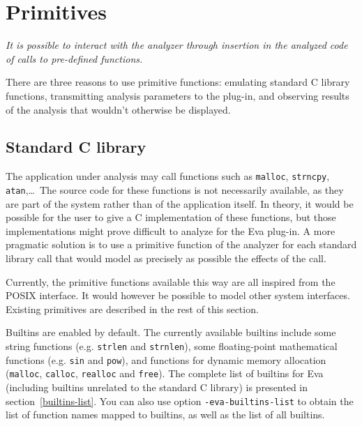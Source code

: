 \documentclass[web]{frama-c-book}
\newcommand{\Eva}{\textsf{Eva}}
\begin{document}
\chapter{Primitives}\label{primitives}
\vspace{2cm}

{\em It is possible to interact with the analyzer
through insertion in the analyzed code of calls to
pre-defined functions.}

\vspace{2cm}

There are three reasons to use primitive functions:
emulating standard C library functions, transmitting
analysis parameters to the plug-in,
and observing results of the analysis that wouldn't otherwise
be displayed.

\section{Standard C library}
\label{libc}

The application under analysis may call functions such as
\lstinline|malloc|, \lstinline|strncpy|, \lstinline|atan|,\ldots\
The source code for these functions is not necessarily available, as
they are part of the system rather than of the application itself. In
theory, it would be possible for the user to give a C implementation
of these functions, but those implementations might prove difficult to
analyze for the \Eva{} plug-in. A more pragmatic solution is to use a
primitive function of the analyzer for each standard library call that
would model as precisely as possible the effects of the call.

Currently, the primitive functions available this way are all inspired
from the \mbox{POSIX} interface. It would however be possible to model
other system interfaces. Existing primitives are described in the rest
of this section.

Builtins are enabled by default. The currently available builtins include
some string functions (e.g. \lstinline|strlen| and \lstinline|strnlen|),
some floating-point mathematical functions (e.g. \lstinline|sin| and
\lstinline|pow|), and functions for dynamic memory allocation
(\lstinline|malloc|, \lstinline|calloc|, \lstinline|realloc| and
\lstinline|free|).
%
The complete list of builtins for \Eva{} (including builtins
unrelated to the standard C library) is presented in
section~\ref{builtins-list}.
%
You can also use option \lstinline|-eva-builtins-list| to obtain the list of
function names mapped to builtins, as well as the list of all builtins.
\end{document}
